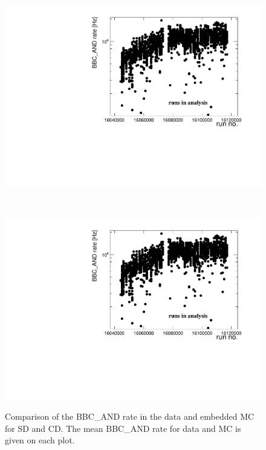 \begin{figure}[H]
	\centering
	\parbox{0.495\textwidth}{
		\centering
		\includegraphics[width=\linewidth,page=7]{graphics/systematicsEfficiency/bbc_and/Out.pdf}\\
	}~
	\parbox{0.495\textwidth}{
		\centering
		\includegraphics[width=\linewidth,page=8]{graphics/systematicsEfficiency/bbc_and/Out.pdf}\\
	}%
	\caption[Comparison of the BBC\_AND rate in the data  and   embedded MC for SD and CD.]{Comparison of the BBC\_AND rate in the data  and   embedded MC for SD and CD. The mean BBC\_AND rate for data and MC is given on each plot.}
	\label{fig:systErrorEmbDataRate}
\end{figure}

